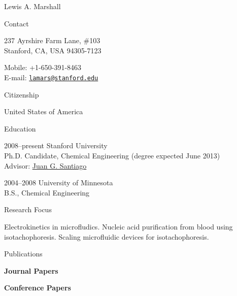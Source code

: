 \documentclass{article}
\begin{document}
\begin{cv}{Lewis A. Marshall}
  \begin{cvlist}{Contact}
    \item 237 Ayrshire Farm Lane, \#103\\
      Stanford, CA, USA 94305-7123
    \item Mobile: +1-650-391-8463\\
      E-mail: \texttt{\href{mailto:lamars@stanford.edu}{lamars@stanford.edu}}
  \end{cvlist}
  
  \begin{cvlist}{Citizenship}
    \item United States of America
  \end{cvlist}
  
  \begin{cvlist}{Education}
    \item[2008--present] Stanford University\\
      Ph.D. Candidate, Chemical Engineering (degree expected June 2013)\\
      Advisor: \href{http://microfluidics.stanford.edu}{Juan G. Santiago}
    \item[2004--2008] University of Minnesota\\
      B.S., Chemical Engineering\\
  \end{cvlist}

\begin{cvlist}{Research Focus}
	\item Electrokinetics in microfludics.
	Nucleic acid purification from blood using isotachophoresis.
	Scaling microfluidic devices for isotachophoresis.
\end{cvlist}


\setlength{\cvlabelwidth}{1em}
\renewcommand*{\bibindent}{1.5em}

\begin{cvlist}{Publications}
    \item \textbf{Journal Papers}


  \item \textbf{Conference Papers} 


\end{cvlist}
\end{cv}
\end{document}
